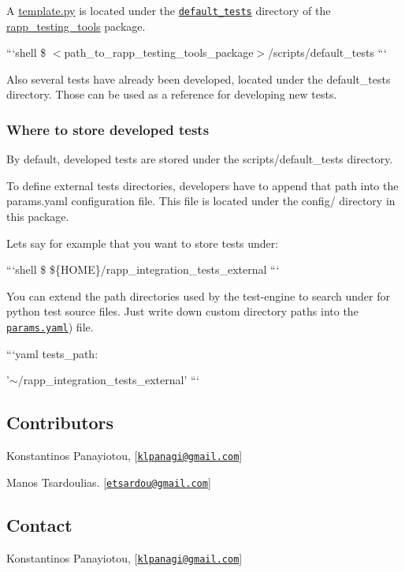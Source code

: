 A \hyperlink{template_8py}{template.\-py} is located under the \href{https://github.com/rapp-project/rapp-platform/tree/master/rapp_testing_tools/scripts/default_tests}{\tt default\-\_\-tests} directory of the \hyperlink{namespacerapp__testing__tools}{rapp\-\_\-testing\-\_\-tools} package.

```shell \$ $<$path\-\_\-to\-\_\-rapp\-\_\-testing\-\_\-tools\-\_\-package$>$/scripts/default\-\_\-tests ```

Also several tests have already been developed, located under the default\-\_\-tests directory. Those can be used as a reference for developing new tests.

\subsubsection*{Where to store developed tests}

By default, developed tests are stored under the scripts/default\-\_\-tests directory.

To define external tests directories, developers have to append that path into the params.\-yaml configuration file. This file is located under the config/ directory in this package.

Lets say for example that you want to store tests under\-:

```shell \$ \$\{H\-O\-M\-E\}/rapp\-\_\-integration\-\_\-tests\-\_\-external ```

You can extend the path directories used by the test-\/engine to search under for python test source files. Just write down custom directory paths into the \href{[params.yaml](https://github.com/rapp-project/rapp-platform/blob/master/rapp_testing_tools/config/params.yaml}{\tt params.\-yaml}) file.

```yaml tests\-\_\-path\-:
\begin{DoxyItemize}
\item '$\sim$/rapp\-\_\-integration\-\_\-tests\-\_\-external' ```
\end{DoxyItemize}

\subsection*{Contributors}


\begin{DoxyItemize}
\item Konstantinos Panayiotou, \mbox{[}\href{mailto:klpanagi@gmail.com}{\tt klpanagi@gmail.\-com}\mbox{]}
\item Manos Tsardoulias. \mbox{[}\href{mailto:etsardou@gmail.com}{\tt etsardou@gmail.\-com}\mbox{]}
\end{DoxyItemize}

\subsection*{Contact}


\begin{DoxyItemize}
\item Konstantinos Panayiotou, \mbox{[}\href{mailto:klpanagi@gmail.com}{\tt klpanagi@gmail.\-com}\mbox{]} 
\end{DoxyItemize}